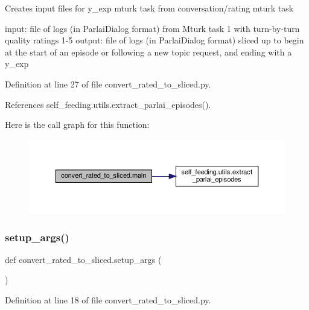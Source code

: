 \begin{DoxyVerb}Creates input files for y_exp mturk task from conversation/rating mturk task

input: file of logs (in ParlaiDialog format) from Mturk task 1 with turn-by-turn
    quality ratings 1-5
output: file of logs (in ParlaiDialog format) sliced up to begin at the start of
    an episode or following a new topic request, and ending with a y_exp
\end{DoxyVerb}
 

Definition at line 27 of file convert\+\_\+rated\+\_\+to\+\_\+sliced.\+py.



References self\+\_\+feeding.\+utils.\+extract\+\_\+parlai\+\_\+episodes().

Here is the call graph for this function\+:
\nopagebreak
\begin{figure}[H]
\begin{center}
\leavevmode
\includegraphics[width=350pt]{namespaceconvert__rated__to__sliced_ad4fd35247a4e417615638391b9db7710_cgraph}
\end{center}
\end{figure}
\mbox{\label{namespaceconvert__rated__to__sliced_a23f7c33059f21fbae93c8c8d71e3a4b5}} 
\subsubsection{\texorpdfstring{setup\+\_\+args()}{setup\_args()}}
{\footnotesize\ttfamily def convert\+\_\+rated\+\_\+to\+\_\+sliced.\+setup\+\_\+args (\begin{DoxyParamCaption}{ }\end{DoxyParamCaption})}



Definition at line 18 of file convert\+\_\+rated\+\_\+to\+\_\+sliced.\+py.



